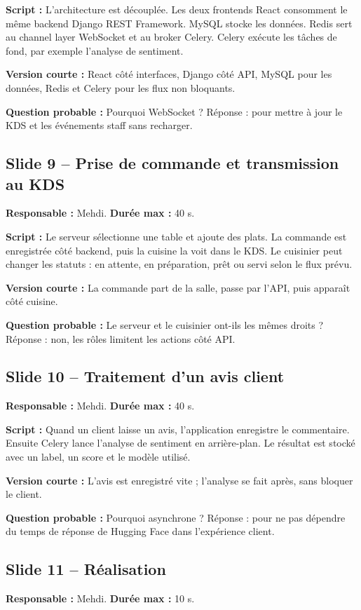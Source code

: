 \documentclass[11pt,a4paper]{article}
\begin{document}
\textbf{Script :} L'architecture est découplée. Les deux frontends React consomment le même backend Django REST Framework. MySQL stocke les données. Redis sert au channel layer WebSocket et au broker Celery. Celery exécute les tâches de fond, par exemple l'analyse de sentiment.

\textbf{Version courte :} React côté interfaces, Django côté API, MySQL pour les données, Redis et Celery pour les flux non bloquants.

\textbf{Question probable :} Pourquoi WebSocket ? Réponse : pour mettre à jour le KDS et les événements staff sans recharger.

\subsection*{Slide 9 -- Prise de commande et transmission au KDS}
\textbf{Responsable :} Mehdi. \textbf{Durée max :} 40 s.

\textbf{Script :} Le serveur sélectionne une table et ajoute des plats. La commande est enregistrée côté backend, puis la cuisine la voit dans le KDS. Le cuisinier peut changer les statuts : en attente, en préparation, prêt ou servi selon le flux prévu.

\textbf{Version courte :} La commande part de la salle, passe par l'API, puis apparaît côté cuisine.

\textbf{Question probable :} Le serveur et le cuisinier ont-ils les mêmes droits ? Réponse : non, les rôles limitent les actions côté API.

\subsection*{Slide 10 -- Traitement d'un avis client}
\textbf{Responsable :} Mehdi. \textbf{Durée max :} 40 s.

\textbf{Script :} Quand un client laisse un avis, l'application enregistre le commentaire. Ensuite Celery lance l'analyse de sentiment en arrière-plan. Le résultat est stocké avec un label, un score et le modèle utilisé.

\textbf{Version courte :} L'avis est enregistré vite ; l'analyse se fait après, sans bloquer le client.

\textbf{Question probable :} Pourquoi asynchrone ? Réponse : pour ne pas dépendre du temps de réponse de Hugging Face dans l'expérience client.

\subsection*{Slide 11 -- Réalisation}
\textbf{Responsable :} Mehdi. \textbf{Durée max :} 10 s.
\end{document}
